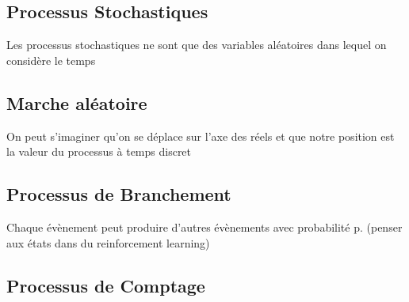 \documentclass{article}
\begin{document}
\subsection{Processus Stochastiques}

\begin{definition}
\end{definition}

\begin{definition}
\end{definition}

\begin{definition}[Trajectoire]
\end{definition}

\begin{remark}
    Les processus stochastiques ne sont que des variables aléatoires dans
    lequel on considère le temps
\end{remark}

\subsection{Marche aléatoire}

\begin{definition}
\end{definition}

\begin{intuition}
    On peut s'imaginer qu'on se déplace sur l'axe des réels et que notre
    position est la valeur du processus à temps discret
\end{intuition}

\subsection{Processus de Branchement}

\begin{definition}
\end{definition}

\begin{intuition}
    Chaque évènement peut produire d'autres évènements avec probabilité p.
    (penser aux états dans du reinforcement learning)
\end{intuition}

\subsection{Processus de Comptage}
\end{document}
